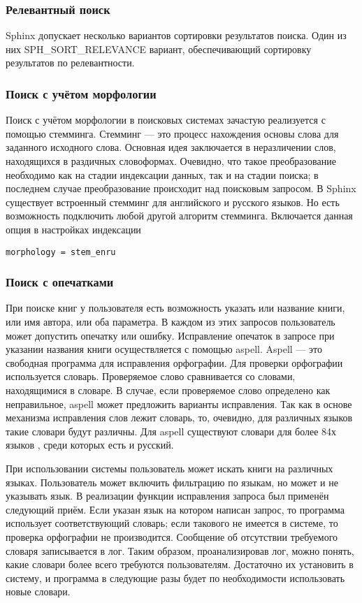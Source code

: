 \subsubsection{Релевантный поиск}

Sphinx допускает несколько вариантов сортировки результатов поиска.
Один из них SPH\_SORT\_RELEVANCE вариант, обеспечивающий сортировку результатов по релевантности.

\subsubsection{Поиск с учётом морфологии}

Поиск с учётом морфологии в поисковых системах зачастую реализуется с помощью стемминга. Стемминг \cite{stemming} --- это процесс нахождения основы слова для заданного исходного слова.
Основная идея заключается в неразличении слов, находящихся в раздичных словоформах.
Очевидно, что такое преобразование необходимо как на стадии индексации данных, так и на стадии поиска; в последнем случае преобразование происходит над поисковым запросом.
В Sphinx существует встроенный стемминг для английского и русского языков.
Но есть возможность подключить любой другой алгоритм стемминга.
Включается данная опция в настройках индексации 
\begin{verbatim}
morphology = stem_enru
\end{verbatim}
\subsubsection{Поиск с опечатками}

При поиске книг у пользователя есть возможность указать или название книги, или имя автора, или оба параметра. В каждом из этих запросов пользователь может допустить опечатку или ошибку.
Исправление опечаток в запросе при указании названия книги осуществляется с помощью aspell. 
Aspell \cite{aspell} --- это свободная программа для исправления орфографии.
Для проверки орфографии используется словарь. 
Проверяемое слово сравнивается со словами, находящимися в словаре.
В случае, если проверяемое слово определено как неправильное, aspell может предложить варианты исправления. Так как в основе механизма исправления слов лежит словарь, то, очевидно, для различных языков такие словари будут различны. Для aspell существуют словари для более 84х языков \cite{langforaspell},
среди которых есть и русский.

При использовании системы пользователь может искать книги на различных языках. Пользователь может включить фильтрацию по языкам, но может и не указывать язык.
В реализации функции исправления запроса был применён следующий приём.
Если указан язык на котором написан запрос, то программа использует соответствующий словарь; если такового не имеется в системе, то проверка орфографии не производится. Сообщение об отсутствии требуемого словаря записывается в лог.
Таким образом, проанализировав лог, можно понять, какие словари более всего требуются пользователям. Достаточно их установить в систему, и программа в следующие разы будет по необходимости использовать новые словари.

